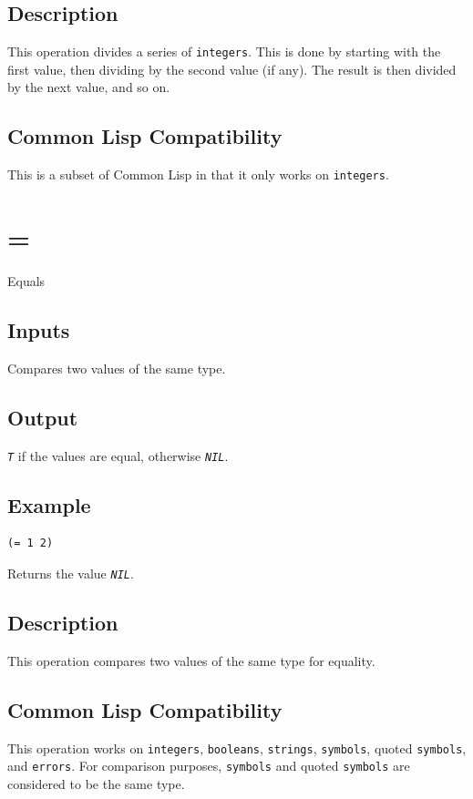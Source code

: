 \documentclass[10pt, openany]{book}
\newcommand{\constant}[1]{\emph{\texttt{#1}}}
\newcommand{\datatype}[1]{\texttt{#1}}
\newcommand{\cl}{Common Lisp}
\begin{document}
\subsection{Description}
This operation divides a series of \datatype{integers}.  This is done by starting with the first value, then dividing by the second value (if any).  The result is then divided by the next value, and so on.
\subsection{Common Lisp Compatibility}
This is a subset of \cl{} in that it only works on \datatype{integers}.

\section{=}
Equals
\subsection{Inputs}
Compares two values of the same type.
\subsection{Output}
\constant{T} if the values are equal, otherwise \constant{NIL}.
\subsection{Example}
\begin{lstlisting}
(= 1 2)
\end{lstlisting}
Returns the value \constant{NIL}.
\subsection{Description}
This operation compares two values of the same type for equality.
\subsection{Common Lisp Compatibility}
This operation works on \datatype{integers}, \datatype{booleans}, \datatype{strings}, \datatype{symbols}, quoted \datatype{symbols}, and \datatype{errors}.  For comparison purposes, \datatype{symbols} and quoted \datatype{symbols} are considered to be the same type.

\end{document}
